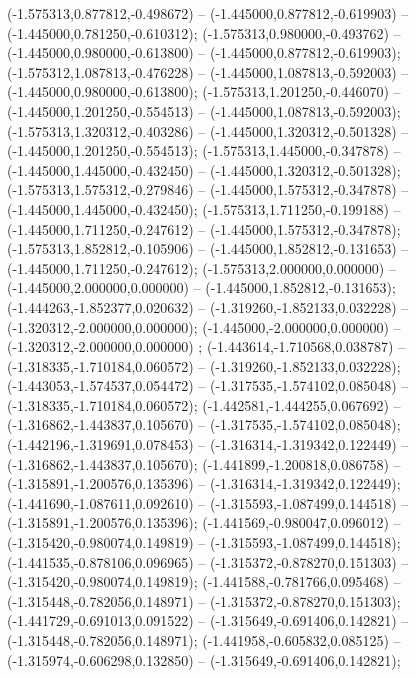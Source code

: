 (-1.575313,0.877812,-0.498672) -- (-1.445000,0.877812,-0.619903) -- (-1.445000,0.781250,-0.610312);
 (-1.575313,0.980000,-0.493762) -- (-1.445000,0.980000,-0.613800) -- (-1.445000,0.877812,-0.619903);
 (-1.575312,1.087813,-0.476228) -- (-1.445000,1.087813,-0.592003) -- (-1.445000,0.980000,-0.613800);
 (-1.575313,1.201250,-0.446070) -- (-1.445000,1.201250,-0.554513) -- (-1.445000,1.087813,-0.592003);
 (-1.575313,1.320312,-0.403286) -- (-1.445000,1.320312,-0.501328) -- (-1.445000,1.201250,-0.554513);
 (-1.575313,1.445000,-0.347878) -- (-1.445000,1.445000,-0.432450) -- (-1.445000,1.320312,-0.501328);
 (-1.575313,1.575312,-0.279846) -- (-1.445000,1.575312,-0.347878) -- (-1.445000,1.445000,-0.432450);
 (-1.575313,1.711250,-0.199188) -- (-1.445000,1.711250,-0.247612) -- (-1.445000,1.575312,-0.347878);
 (-1.575313,1.852812,-0.105906) -- (-1.445000,1.852812,-0.131653) -- (-1.445000,1.711250,-0.247612);
 (-1.575313,2.000000,0.000000) -- (-1.445000,2.000000,0.000000) -- (-1.445000,1.852812,-0.131653);
 (-1.444263,-1.852377,0.020632) -- (-1.319260,-1.852133,0.032228) -- (-1.320312,-2.000000,0.000000);
 (-1.445000,-2.000000,0.000000) -- (-1.320312,-2.000000,0.000000) ;
 (-1.443614,-1.710568,0.038787) -- (-1.318335,-1.710184,0.060572) -- (-1.319260,-1.852133,0.032228);
 (-1.443053,-1.574537,0.054472) -- (-1.317535,-1.574102,0.085048) -- (-1.318335,-1.710184,0.060572);
 (-1.442581,-1.444255,0.067692) -- (-1.316862,-1.443837,0.105670) -- (-1.317535,-1.574102,0.085048);
 (-1.442196,-1.319691,0.078453) -- (-1.316314,-1.319342,0.122449) -- (-1.316862,-1.443837,0.105670);
 (-1.441899,-1.200818,0.086758) -- (-1.315891,-1.200576,0.135396) -- (-1.316314,-1.319342,0.122449);
 (-1.441690,-1.087611,0.092610) -- (-1.315593,-1.087499,0.144518) -- (-1.315891,-1.200576,0.135396);
 (-1.441569,-0.980047,0.096012) -- (-1.315420,-0.980074,0.149819) -- (-1.315593,-1.087499,0.144518);
 (-1.441535,-0.878106,0.096965) -- (-1.315372,-0.878270,0.151303) -- (-1.315420,-0.980074,0.149819);
 (-1.441588,-0.781766,0.095468) -- (-1.315448,-0.782056,0.148971) -- (-1.315372,-0.878270,0.151303);
 (-1.441729,-0.691013,0.091522) -- (-1.315649,-0.691406,0.142821) -- (-1.315448,-0.782056,0.148971);
 (-1.441958,-0.605832,0.085125) -- (-1.315974,-0.606298,0.132850) -- (-1.315649,-0.691406,0.142821);
